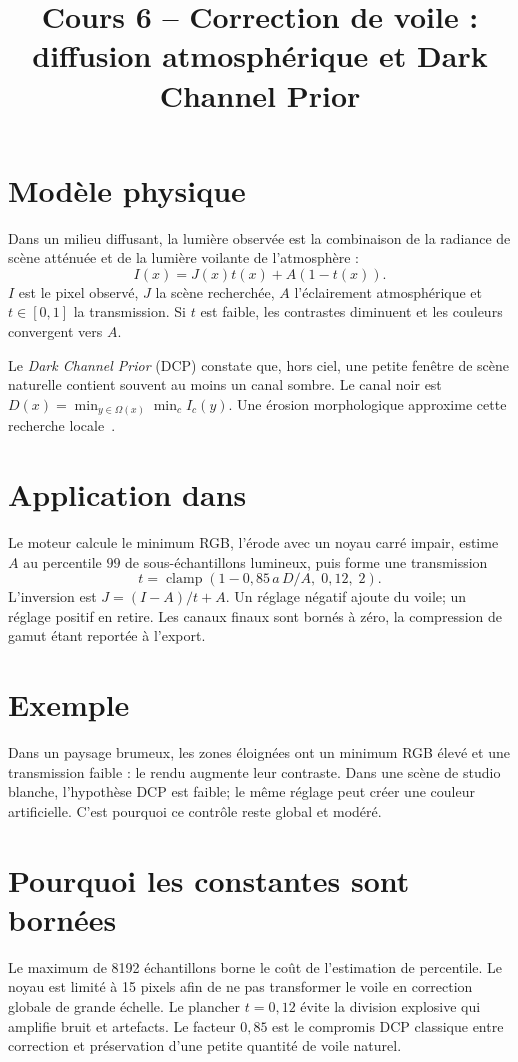 
\title{Cours 6 -- Correction de voile : diffusion atmosphérique et Dark Channel Prior}


\section{Modèle physique}
Dans un milieu diffusant, la lumière observée est la combinaison de la radiance de scène atténuée et de la lumière voilante de l'atmosphère :
\begin{equation}
I(x)=J(x)t(x)+A(1-t(x)).
\end{equation}
$I$ est le pixel observé, $J$ la scène recherchée, $A$ l'éclairement atmosphérique et $t\in[0,1]$ la transmission. Si $t$ est faible, les contrastes diminuent et les couleurs convergent vers $A$.

Le \emph{Dark Channel Prior} (DCP) constate que, hors ciel, une petite fenêtre de scène naturelle contient souvent au moins un canal sombre. Le canal noir est $D(x)=\min_{y\in\Omega(x)}\min_c I_c(y)$. Une érosion morphologique approxime cette recherche locale~\cite{he2009,he2011}.

\section{Application dans \IPR{}}
Le moteur calcule le minimum RGB, l'érode avec un noyau carré impair, estime $A$ au percentile $99$ de sous-échantillons lumineux, puis forme une transmission
\begin{equation}
t=\operatorname{clamp}(1-0{,}85\,a\,D/A,\;0{,}12,\;2).
\end{equation}
L'inversion est $J=(I-A)/t+A$. Un réglage négatif ajoute du voile; un réglage positif en retire. Les canaux finaux sont bornés à zéro, la compression de gamut étant reportée à l'export.

\section{Exemple}
Dans un paysage brumeux, les zones éloignées ont un minimum RGB élevé et une transmission faible : le rendu augmente leur contraste. Dans une scène de studio blanche, l'hypothèse DCP est faible; le même réglage peut créer une couleur artificielle. C'est pourquoi ce contrôle reste global et modéré.

\section{Pourquoi les constantes sont bornées}
Le maximum de 8192 échantillons borne le coût de l'estimation de percentile. Le noyau est limité à 15 pixels afin de ne pas transformer le voile en correction globale de grande échelle. Le plancher $t=0{,}12$ évite la division explosive qui amplifie bruit et artefacts. Le facteur $0{,}85$ est le compromis DCP classique entre correction et préservation d'une petite quantité de voile naturel.



